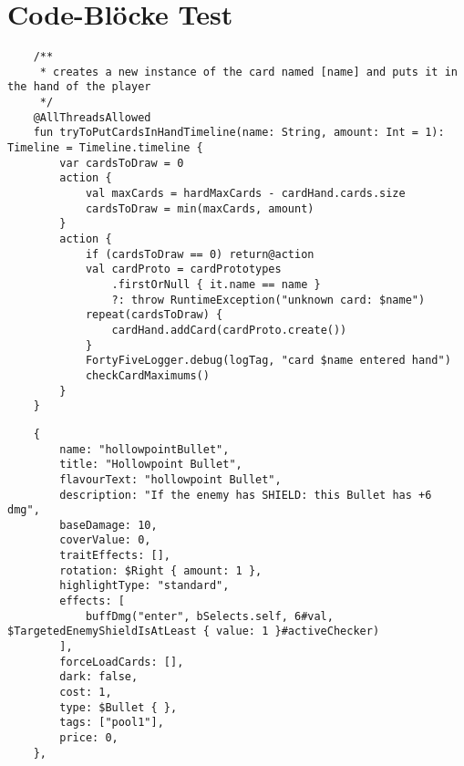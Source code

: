 
\chapter{Code-Blöcke Test}\label{ch:code-blocke-test}

\renewcommand{\kapitelautor}{Autor: Marvin}

\Blindtext

\begin{verbatim}
    /**
     * creates a new instance of the card named [name] and puts it in the hand of the player
     */
    @AllThreadsAllowed
    fun tryToPutCardsInHandTimeline(name: String, amount: Int = 1): Timeline = Timeline.timeline {
        var cardsToDraw = 0
        action {
            val maxCards = hardMaxCards - cardHand.cards.size
            cardsToDraw = min(maxCards, amount)
        }
        action {
            if (cardsToDraw == 0) return@action
            val cardProto = cardPrototypes
                .firstOrNull { it.name == name }
                ?: throw RuntimeException("unknown card: $name")
            repeat(cardsToDraw) {
                cardHand.addCard(cardProto.create())
            }
            FortyFiveLogger.debug(logTag, "card $name entered hand")
            checkCardMaximums()
        }
    }
\end{verbatim}

\begin{verbatim}
    {
        name: "hollowpointBullet",
        title: "Hollowpoint Bullet",
        flavourText: "hollowpoint Bullet",
        description: "If the enemy has SHIELD: this Bullet has +6 dmg",
        baseDamage: 10,
        coverValue: 0,
        traitEffects: [],
        rotation: $Right { amount: 1 },
        highlightType: "standard",
        effects: [
            buffDmg("enter", bSelects.self, 6#val, $TargetedEnemyShieldIsAtLeast { value: 1 }#activeChecker)
        ],
        forceLoadCards: [],
        dark: false,
        cost: 1,
        type: $Bullet { },
        tags: ["pool1"],
        price: 0,
    },
\end{verbatim}

\Blindtext

\renewcommand{\kapitelautor}{}
